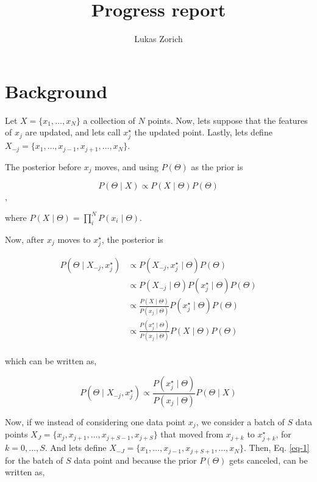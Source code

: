 \documentclass{article}
\begin{document}
\title{Progress report}
\author{Lukas Zorich}

\maketitle

\section{Background}

Let $X = \{ x_1, \dotsc, x_N \}$ a collection of $N$ points. Now, lets 
suppose that the features of $x_j$ are updated, and lets call $x_j^{\star}$
the updated point. Lastly, lets define 
$X_{-j} = \{ x_1, \dotsc, x_{j-1}, x_{j+1}, \dotsc, x_N \}$.

The posterior before $x_j$ moves, and using $P(\Theta)$ as the prior is

$$P(\Theta \mid X) \propto P(X \mid \Theta)P(\Theta)$$,

where $P(X \mid \Theta) = \prod_i^N P(x_i \mid \Theta)$.

Now, after $x_j$ moves to $x_j^{\star}$, the posterior is

\begin{align}
P(\Theta \mid X_{-j}, x_j^{\star}) &\propto P(X_{-j}, x_j^{\star} \mid \Theta)
    P(\Theta) \\
&\propto P(X_{-j} \mid \Theta)P(x_j^{\star} \mid \Theta)
    P(\Theta) \\
&\propto \frac{P(X \mid \Theta)}{P(x_j \mid \Theta)}P(x_j^{\star} \mid \Theta)
    P(\Theta) \\
&\propto \frac{P(x_j^{\star} \mid \Theta)}{P(x_j \mid \Theta)}P(X \mid \Theta)
    P(\Theta) \\
\end{align}

which can be written as,

\begin{equation}
\label{eq-1}
P(\Theta \mid X_{-j}, x_j^{\star}) \propto 
\frac{P(x_j^{\star} \mid \Theta)}{P(x_j \mid \Theta)}P(\Theta \mid X)
\end{equation}

Now, if we instead of considering one data point $x_j$, we consider a batch
of $S$ data points $X_J = \{ x_j, x_{j+1}, \dotsc, x_{j + S - 1}, x_{j + S} \}$
that moved from $x_{j + k}$ to $x_{j + k}^{\star}$, for $k = 0, \dotsc, S$. And
lets define $X_{-J} = \{ x_1, \dotsc, x_{j-1}, x_{j + S + 1}, \dotsc, x_N \}$.
Then, Eq. \ref{eq-1} for the batch of $S$ data point and because the prior
$P(\Theta)$ gets canceled, can be written as,
\end{document}
